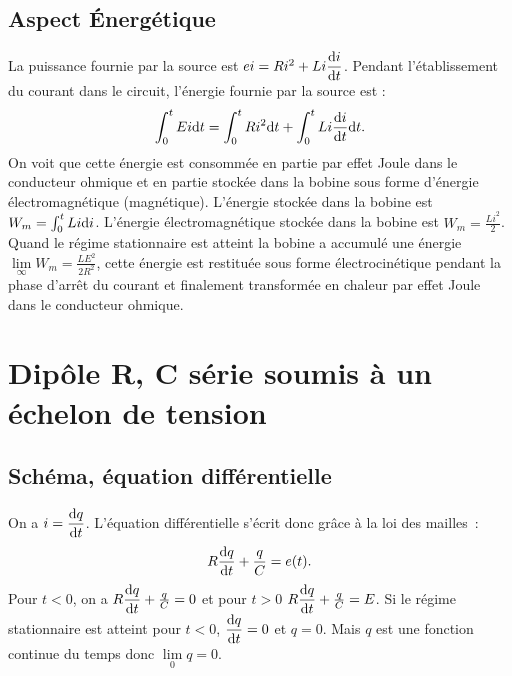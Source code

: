 \subsection{Aspect Énergétique}%
La puissance fournie par la source est \(ei = Ri^2+Li \dfrac{\mathrm{d} i}{\mathrm{d} t}\). Pendant 
l'établissement du courant dans le circuit, l'énergie fournie par la source est 
:
\begin{equation}%
  \int_0^t Ei \D t = \int_0^t Ri^2 \D t+ \int_0^t Li \derived{i}{t} \D t.
\end{equation}%
On voit que cette énergie est consommée en partie par effet Joule dans le 
conducteur ohmique et en partie stockée dans la bobine sous forme d'énergie 
électromagnétique (magnétique). L'énergie stockée dans la bobine est \(W_m = 
\int_0^t Li \mathrm{d} i\). L'énergie électromagnétique stockée dans la bobine est 
\(W_m = \frac{Li^2}{2}\). Quand le régime stationnaire est atteint la bobine a 
accumulé une énergie \(\lim\limits_{\infty} W_m = \frac{LE^2}{2R^2}\), cette 
énergie est restituée sous forme électrocinétique pendant la phase d'arrêt du 
courant et finalement transformée en chaleur par effet Joule dans le conducteur 
ohmique.
\section{Dipôle R, C série soumis à un échelon de tension}%
\label{sec:RLCserie}%
\subsection{Schéma, équation différentielle}%
On a \(i = \dfrac{\mathrm{d} q}{\mathrm{d} t}\). L'équation différentielle s'écrit donc grâce à la 
loi des mailles~:
\begin{equation}%
  R \derived{q}{t} + \frac{q}{C} = e(t).
\end{equation}%
Pour \(t < 0\), on a \(R \dfrac{\mathrm{d} q}{\mathrm{d} t} + \frac{q}{C} = 0\) et pour \(t > 0\) 
\(R \dfrac{\mathrm{d} q}{\mathrm{d} t} + \frac{q}{C} = E\). Si le régime stationnaire est atteint 
pour \(t < 0\), \(\dfrac{\mathrm{d} q}{\mathrm{d} t} = 0\) et \(q = 0\). Mais \(q\) est une 
fonction continue du temps donc \(\lim\limits_{0} q =0\).
